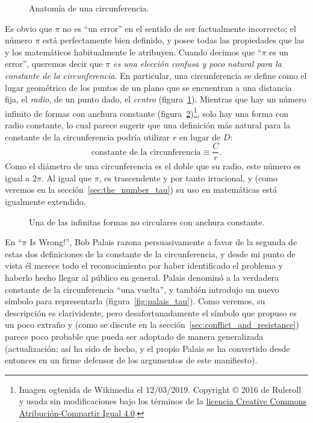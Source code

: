 \begin{figure}
\caption{Anatomía de una circunferencia.\label{fig:circle}}
\end{figure}

Es obvio que $\pi$ no es ``un error'' en el sentido de ser factualmente incorrecto; el número $\pi$ está perfectamente bien definido, y posee todas las propiedades que las y los matemáticos habitualmente le atribuyen. Cuando decimos que ``$\pi$ es un error'', queremos decir que \emph{$\pi$ es una elección confusa y poco natural para la constante de la circunferencia}. En particular, una circunferencia se define como el lugar geométrico de los puntos de un plano que se encuentran a una distancia fija, el \emph{radio}, de un punto dado, el \emph{centro} (figura~\ref{fig:circle}). Mientras que hay un número infinito de formas con anchura constante (figura~\ref{fig:constant_width})\footnote{Imagen ogtenida de Wikimedia el 12/03/2019. Copyright © 2016 de Ruleroll y usada sin modificaciones bajo los términos de la \href{https://creativecommons.org/licenses/by-sa/4.0/deed.es}{licencia Creative Commons Atribución-Compartir Igual 4.0}.}, solo hay una forma con radio constante, lo cual parece sugerir que una definición más natural para la constante de la circunferencia podría utilizar $r$ en lugar de $D$:
\begin{equation}
\label{eq:circle_constant}
\mbox{constante de la circunferencia} \equiv \frac{C}{r}.
\end{equation}
Como el diámetro de una circunferencia es el doble que su radio, este número es igual a $2\pi$. Al igual que $\pi$, es trascendente y por tanto irracional, y (como veremos en la sección~\ref{sec:the_number_tau}) su uso en matemáticas está igualmente extendido.

\begin{figure}
\caption{Una de las infinitas formas no circulares con anchura constante.\label{fig:constant_width}}
\end{figure}

En ``$\pi$ Is Wrong!'', Bob Palais razona persuasivamente a favor de la segunda de estas dos definiciones de la constante de la circunferencia, y desde mi punto de vista él merece todo el reconocimiento por haber identificado el problema y haberlo hecho llegar al público en general. Palais denominó a la verdadera constante de la circunferencia ``una vuelta'', y también introdujo un nuevo símbolo para representarla (figura~\ref{fig:palais_tau}). Como veremos, su descripción es clarividente, pero desafortunadamente el símbolo que propuso es un poco extraño y (como se discute en la sección~\ref{sec:conflict_and_resistance}) parece poco probable que pueda ser adoptado de manera generalizada (actualización: así ha sido de hecho, y el propio Palais se ha convertido desde entonces en un firme defensor de los argumentos de este manifiesto).

